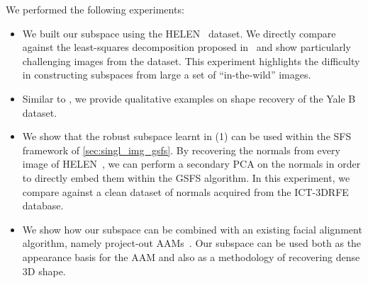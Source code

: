 We performed the following experiments:
\begin{itemize}
    \item We built our subspace using the HELEN~\cite{le2012interactive}
          dataset. We directly compare against the least-squares decomposition
          proposed in~\cite{KemelmacherShlizerman:2013iv} and show particularly
          challenging images from the dataset. This experiment highlights the
          difficulty in constructing subspaces from large a set of
          ``in-the-wild'' images.
    \item Similar to \citet{KemelmacherShlizerman:2013iv}, we provide
          qualitative examples on shape recovery of the Yale B dataset.
    \item We show that the robust subspace learnt in (1) can be used within the
          SFS framework of \cref{sec:singl_img_gsfs}. By recovering the normals
          from every image of HELEN~\cite{le2012interactive}, we can perform a
          secondary PCA on the normals in order to directly embed them within
          the GSFS algorithm. In this experiment, we compare against a clean
          dataset of normals acquired from the
          ICT-3DRFE~\cite{stratou2012exploring} database.
    \item We show how our subspace can be combined with an existing facial
    alignment algorithm, namely project-out AAMs~\cite{matthews2004active}. Our
    subspace can be used both as the appearance basis for the AAM and also as a
    methodology of recovering dense 3D shape.
\end{itemize}

